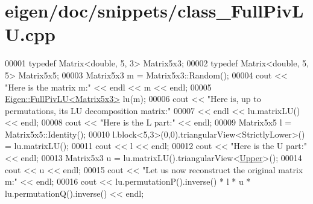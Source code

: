 \hypertarget{eigen_2doc_2snippets_2class___full_piv_l_u_8cpp_source}{}\section{eigen/doc/snippets/class\+\_\+\+Full\+Piv\+LU.cpp}
\label{eigen_2doc_2snippets_2class___full_piv_l_u_8cpp_source}

\begin{DoxyCode}
00001 \textcolor{keyword}{typedef} Matrix<double, 5, 3> Matrix5x3;
00002 \textcolor{keyword}{typedef} Matrix<double, 5, 5> Matrix5x5;
00003 Matrix5x3 m = Matrix5x3::Random();
00004 cout << \textcolor{stringliteral}{"Here is the matrix m:"} << endl << m << endl;
00005 \hyperlink{group___l_u___module_class_eigen_1_1_full_piv_l_u}{Eigen::FullPivLU<Matrix5x3>} lu(m);
00006 cout << \textcolor{stringliteral}{"Here is, up to permutations, its LU decomposition matrix:"}
00007      << endl << lu.matrixLU() << endl;
00008 cout << \textcolor{stringliteral}{"Here is the L part:"} << endl;
00009 Matrix5x5 l = Matrix5x5::Identity();
00010 l.block<5,3>(0,0).triangularView<StrictlyLower>() = lu.matrixLU();
00011 cout << l << endl;
00012 cout << \textcolor{stringliteral}{"Here is the U part:"} << endl;
00013 Matrix5x3 u = lu.matrixLU().triangularView<\hyperlink{group__enums_gga39e3366ff5554d731e7dc8bb642f83cda6bcb58be3b8b8ec84859ce0c5ac0aaec}{Upper}>();
00014 cout << u << endl;
00015 cout << \textcolor{stringliteral}{"Let us now reconstruct the original matrix m:"} << endl;
00016 cout << lu.permutationP().inverse() * l * u * lu.permutationQ().inverse() << endl;
\end{DoxyCode}
